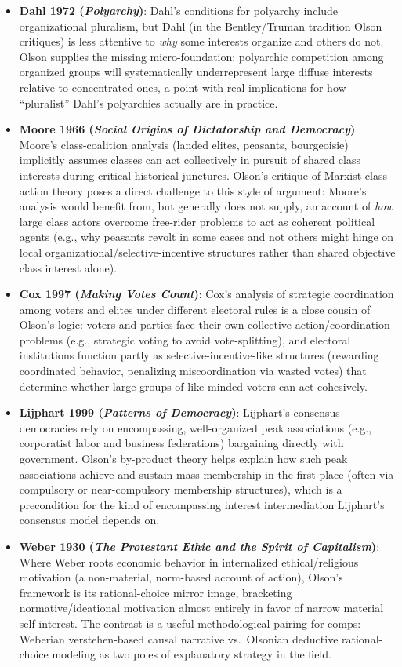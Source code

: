 \documentclass[12pt]{article}
\begin{document}
\begin{itemize}[leftmargin=*, itemsep=4pt]
    \item \textbf{Dahl 1972 (\textit{Polyarchy})}: Dahl's conditions for polyarchy include organizational pluralism, but Dahl (in the Bentley/Truman tradition Olson critiques) is less attentive to \emph{why} some interests organize and others do not. Olson supplies the missing micro-foundation: polyarchic competition among organized groups will systematically underrepresent large diffuse interests relative to concentrated ones, a point with real implications for how ``pluralist'' Dahl's polyarchies actually are in practice.
    \item \textbf{Moore 1966 (\textit{Social Origins of Dictatorship and Democracy})}: Moore's class-coalition analysis (landed elites, peasants, bourgeoisie) implicitly assumes classes can act collectively in pursuit of shared class interests during critical historical junctures. Olson's critique of Marxist class-action theory poses a direct challenge to this style of argument: Moore's analysis would benefit from, but generally does not supply, an account of \emph{how} large class actors overcome free-rider problems to act as coherent political agents (e.g., why peasants revolt in some cases and not others might hinge on local organizational/selective-incentive structures rather than shared objective class interest alone).
    \item \textbf{Cox 1997 (\textit{Making Votes Count})}: Cox's analysis of strategic coordination among voters and elites under different electoral rules is a close cousin of Olson's logic: voters and parties face their own collective action/coordination problems (e.g., strategic voting to avoid vote-splitting), and electoral institutions function partly as selective-incentive-like structures (rewarding coordinated behavior, penalizing miscoordination via wasted votes) that determine whether large groups of like-minded voters can act cohesively.
    \item \textbf{Lijphart 1999 (\textit{Patterns of Democracy})}: Lijphart's consensus democracies rely on encompassing, well-organized peak associations (e.g., corporatist labor and business federations) bargaining directly with government. Olson's by-product theory helps explain how such peak associations achieve and sustain mass membership in the first place (often via compulsory or near-compulsory membership structures), which is a precondition for the kind of encompassing interest intermediation Lijphart's consensus model depends on.
    \item \textbf{Weber 1930 (\textit{The Protestant Ethic and the Spirit of Capitalism})}: Where Weber roots economic behavior in internalized ethical/religious motivation (a non-material, norm-based account of action), Olson's framework is its rational-choice mirror image, bracketing normative/ideational motivation almost entirely in favor of narrow material self-interest. The contrast is a useful methodological pairing for comps: Weberian verstehen-based causal narrative vs.\ Olsonian deductive rational-choice modeling as two poles of explanatory strategy in the field.

\end{itemize}
\end{document}
